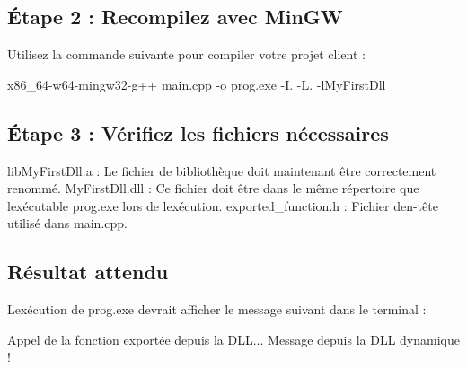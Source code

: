 \subsection*{Étape 2 \+: Recompilez avec Min\+GW}

Utilisez la commande suivante pour compiler votre projet client \+:


\begin{DoxyCode}
x86\_64-w64-mingw32-g++ main.cpp -o prog.exe -I. -L. -lMyFirstDll
\end{DoxyCode}


\subsection*{Étape 3 \+: Vérifiez les fichiers nécessaires}

lib\+My\+First\+Dll.\+a \+: Le fichier de bibliothèque doit maintenant être correctement renommé. My\+First\+Dll.\+dll \+: Ce fichier doit être dans le même répertoire que l\textquotesingle{}exécutable prog.\+exe lors de l\textquotesingle{}exécution. exported\+\_\+function.\+h \+: Fichier d\textquotesingle{}en-\/tête utilisé dans main.\+cpp.

\subsection*{Résultat attendu}

L\textquotesingle{}exécution de prog.\+exe devrait afficher le message suivant dans le terminal \+:


\begin{DoxyCode}
Appel de la fonction exportée depuis la DLL...
Message depuis la DLL dynamique !
\end{DoxyCode}
 